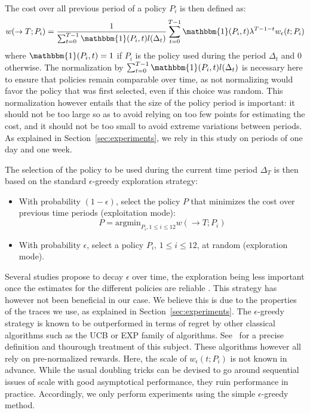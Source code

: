 \documentclass[sigconf,anonymous]{acmart}
\begin{document}

The cost over all previous period of a policy $P_i$ is then defined as:
%
\begin{equation} \label{eq:tot-cost-greedy} w(\rightarrow T;P_i) =
\frac{1}{\sum_{t=0}^{T-1} \mathbbm{1}(P_i,t) l(\Delta_t)} \sum_{t=0}^{T-1}
\mathbbm{1}(P_i,t) \lambda^{T-1-t} w_{\epsilon}(t;P_i) \end{equation}
%
where $\mathbbm{1}(P_i,t) = 1$ if $P_i$ is the policy used during the period
$\Delta_t$ and $0$ otherwise. The normalization by $\sum_{t=0}^{T-1}
\mathbbm{1}(P_i,t) l(\Delta_t)$ is necessary here to ensure that policies
remain comparable over time, as not normalizing would favor the policy that was
first selected, even if this choice was random. This normalization however
entails that the size of the policy period is important: it should not be too
large so as to avoid relying on too few points for estimating the cost, and it
should not be too small to avoid extreme variations between periods. As
explained in Section~\ref{sec:experiments}, we rely in this study on periods of
one day and one week.

The selection of the policy to be used during the current time period
$\Delta_T$ is then based on the standard $\epsilon$-greedy exploration
strategy:

%
\begin{itemize}
\item With probability $(1-\epsilon)$, select the policy $P$ that minimizes the cost over previous time periods (exploitation mode):
%
\begin{equation}
\label{eq:select-greedy}
P = \mbox{argmin}_{P_i, 1 \le i \le 12} w(\rightarrow T;P_i)
\end{equation}
%
\item With probability $\epsilon$, select a policy $P_i, \, 1 \le i \le 12$, at random (exploration mode).
\end{itemize}

Several studies propose to decay $\epsilon$ over time, the exploration being
less important once the estimates for the different policies are reliable
\cite{Tokic:2010}. This strategy has however not been beneficial in our case.
We believe this is due to the properties of the traces we use, as explained in
Section~\ref{sec:experiments}. The $\epsilon$-greedy strategy is known to be
outperformed in terms of regret by other classical algorithms such as the UCB
or EXP family of algorithms. See~\cite{bubnow} for a precise definition and
thourough treatment of this subject. These algorithms however all rely on
pre-normalized rewards. Here, the scale of $w_{\epsilon}(t;P_i)$ is not known
in advance. While the usual doubling tricks can be devised to go around
sequential issues of scale with good asymptotical performance, they ruin
performance in practice. Accordingly, we only perform experiments using the
simple $\epsilon$-greedy method.
\end{document}
